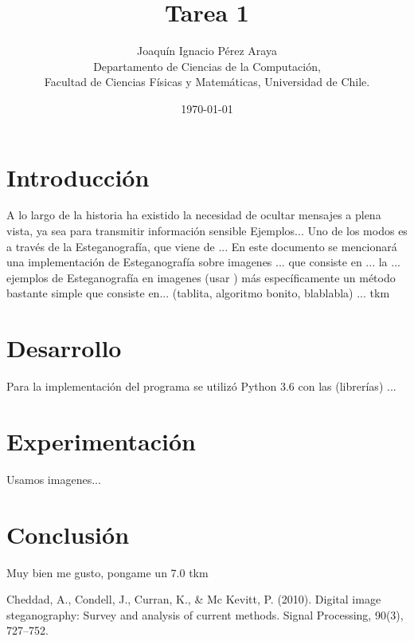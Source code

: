 \documentclass{article}
\begin{document}
\title{Tarea 1 }
\author{Joaquín Ignacio Pérez Araya\footnotemark \\ Departamento de Ciencias de la Computación, \\ Facultad de Ciencias Físicas y Matemáticas, Universidad de Chile.}
\date{\today}


\maketitle

\begin{abstract}

\end{abstract}

\section*{Introducción} %
    A lo largo de la historia ha existido la necesidad de ocultar mensajes a plena vista, ya sea para transmitir información sensible  Ejemplos...
    Uno de los modos es a través de la Esteganografía, que viene de ...
    En este documento se mencionará una implementación de Esteganografía sobre imagenes ... que consiste en ... la
    ... ejemplos de Esteganografía en imagenes (usar \cite{DIS})
    más específicamente un método bastante simple que consiste en...
    (tablita, algoritmo bonito, blablabla)
    ...
    tkm

\section*{Desarrollo}
	Para la implementación del programa se utilizó Python 3.6 con las (librerías) ...
	
	
\section*{Experimentación}
	Usamos imagenes...

\section*{Conclusión}
	Muy bien me gusto, pongame un 7.0 tkm

\begin{thebibliography}{99}
 Cheddad, A., Condell, J., Curran, K., & Mc Kevitt, P. (2010). Digital image steganography: Survey and analysis of current methods. Signal Processing, 90(3), 727–752. 


\end{thebibliography}
\end{document}
